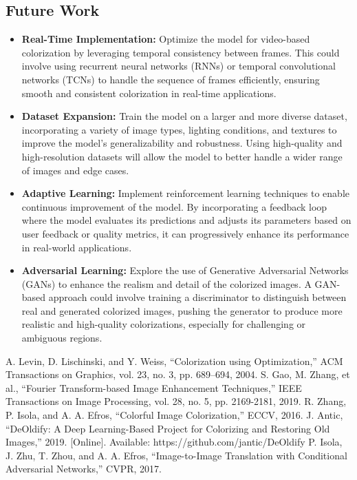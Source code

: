 \documentclass[conference]{IEEEtran}
\begin{document}
\subsection{Future Work}
\begin{itemize}
    \item \textbf{Real-Time Implementation:} Optimize the model for video-based colorization by leveraging temporal consistency between frames. This could involve using recurrent neural networks (RNNs) or temporal convolutional networks (TCNs) to handle the sequence of frames efficiently, ensuring smooth and consistent colorization in real-time applications.
    \item \textbf{Dataset Expansion:} Train the model on a larger and more diverse dataset, incorporating a variety of image types, lighting conditions, and textures to improve the model's generalizability and robustness. Using high-quality and high-resolution datasets will allow the model to better handle a wider range of images and edge cases.
    \item \textbf{Adaptive Learning:} Implement reinforcement learning techniques to enable continuous improvement of the model. By incorporating a feedback loop where the model evaluates its predictions and adjusts its parameters based on user feedback or quality metrics, it can progressively enhance its performance in real-world applications.
    \item \textbf{Adversarial Learning:} Explore the use of Generative Adversarial Networks (GANs) to enhance the realism and detail of the colorized images. A GAN-based approach could involve training a discriminator to distinguish between real and generated colorized images, pushing the generator to produce more realistic and high-quality colorizations, especially for challenging or ambiguous regions.
\end{itemize}


\begin{thebibliography}{99}
 A. Levin, D. Lischinski, and Y. Weiss, “Colorization using Optimization,” ACM Transactions on Graphics, vol. 23, no. 3, pp. 689–694, 2004.
 S. Gao, M. Zhang, et al., “Fourier Transform-based Image Enhancement Techniques,” IEEE Transactions on Image Processing, vol. 28, no. 5, pp. 2169-2181, 2019.
 R. Zhang, P. Isola, and A. A. Efros, “Colorful Image Colorization,” ECCV, 2016.
 J. Antic, “DeOldify: A Deep Learning-Based Project for Colorizing and Restoring Old Images,” 2019. [Online]. Available: https://github.com/jantic/DeOldify
 P. Isola, J. Zhu, T. Zhou, and A. A. Efros, “Image-to-Image Translation with Conditional Adversarial Networks,” CVPR, 2017.
\end{thebibliography}
\vspace{12pt}
\end{document}
